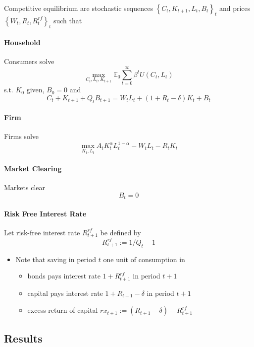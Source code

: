 \documentclass[10pt]{article}
\begin{document}
Competitive equilibrium are stochastic sequences $\left\{C_t, K_{t+1}, L_t, B_t\right\}_t$ and prices $\left\{W_t, R_t, R_t^{r f}\right\}_t$ such that

\paragraph{Household}

Consumers solve
$$
\max _{C_t, L_t, K_{t+1}} \mathbb{E}_0 \sum_{t=0}^{\infty} \beta^t U\left(C_t, L_t\right)
$$
s.t. $K_0$ given, $B_0=0$ and
$$
C_t+K_{t+1}+Q_t B_{t+1}=W_t L_t+\left(1+R_t-\delta\right) K_t+B_t
$$


\paragraph{Firm}

Firms solve
$$
\max _{K_t, L_t} A_t K_t^\alpha L_t^{1-\alpha}-W_t L_t-R_t K_t
$$

\paragraph{Market Clearing}

Markets clear
$$
B_t=0
$$


\paragraph{Risk Free Interest Rate}

Let risk-free interest rate $R_{t+1}^{r f}$ be defined by
$$
R_{t+1}^{r f}:=1 / Q_t-1
$$

\begin{itemize}
    \item Note that saving in period $t$ one unit of consumption in
        \begin{itemize}
            \item bonds pays interest rate $1+R_{t+1}^{r f}$ in period $t+1$
            \item capital pays interest rate $1+R_{t+1}-\delta$ in period $t+1$
            \item excess return of capital $r x_{t+1}:=\left(R_{t+1}-\delta\right)-R_{t+1}^{r f}$
        \end{itemize}
\end{itemize}


\subsection{Results}
\end{document}
